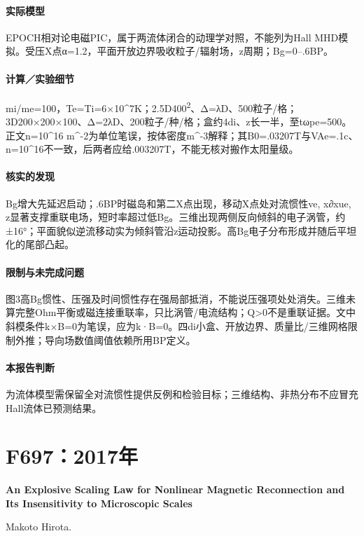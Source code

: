 \paragraph{实际模型}EPOCH相对论电磁PIC，属于两流体闭合的动理学对照，不能列为Hall MHD模拟。受压X点α=1.2，平面开放边界吸收粒子/辐射场，z周期；Bg=0–.6BP。

\paragraph{计算／实验细节}mi/me=100，Te=Ti=6×10\textasciicircum{}7K；2.5D400\textsuperscript{2}、Δ=λD、500粒子/格；3D200×200×100、Δ=2λD、200粒子/种/格；盒约4di、z长一半，至tωpe=500。正文n=10\textasciicircum{}16 m\textasciicircum{}-2为单位笔误，按体密度m\textasciicircum{}-3解释；其B0=.03207T与VAe=.1c、n=10\textasciicircum{}16不一致，后两者应给.003207T，不能无核对搬作太阳量级。

\paragraph{核实的发现}Bg增大先延迟启动；.6BP时磁岛和第二X点出现，移动X点处对流惯性ve, x∂xue, z显著支撑重联电场，短时率超过低Bg。三维出现两侧反向倾斜的电子涡管，约±16°；平面貌似逆流移动实为倾斜管沿z运动投影。高Bg电子分布形成并随后平坦化的尾部凸起。

\paragraph{限制与未完成问题}图3高Bg惯性、压强及时间惯性存在强局部抵消，不能说压强项处处消失。三维未算完整Ohm平衡或磁连接重联率，只比涡管/电流结构；Q>0不是重联证据。文中斜模条件k×B=0为笔误，应为k·B=0。四di小盒、开放边界、质量比/三维网格限制外推；导向场数值阈值依赖所用BP定义。

\paragraph{本报告判断}为流体模型需保留全对流惯性提供反例和检验目标；三维结构、非热分布不应冒充Hall流体已预测结果。

\section{F697：2017年}\label{paper:F697}

\textbf{An Explosive Scaling Law for Nonlinear Magnetic Reconnection and Its Insensitivity to Microscopic Scales}\citep{F697}\

Makoto Hirota.

